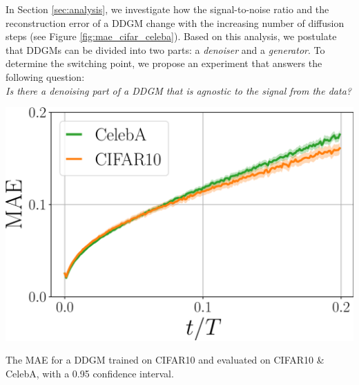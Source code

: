 In Section \ref{sec:analysis}, we investigate how the signal-to-noise ratio and the reconstruction error of a DDGM change with the increasing number of diffusion steps (see Figure \ref{fig:mae_cifar_celeba}). Based on this analysis, we postulate that DDGMs can be divided into two parts: a \emph{denoiser} and a \emph{generator}. To determine the switching point, we propose an experiment that answers the following question: \\
\textit{Is there a denoising part of a DDGM that is agnostic to the signal from the data?}
\begin{marginfigure}
	\vspace*{2\baselineskip}
	\includegraphics[width=\linewidth]{pics/4_daed/experiments/MAE_step_cifar_celeba.pdf}
	\caption{The MAE for a DDGM trained on CIFAR10 and evaluated on CIFAR10 \& CelebA, with a 0.95 confidence interval.}
	\label{fig:mae_cifar_celeba}
\end{marginfigure}
